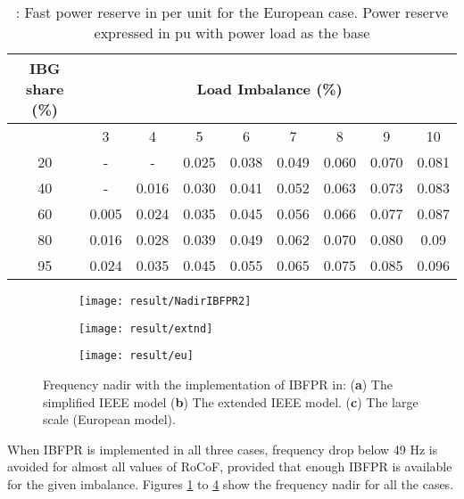 \begin{table}[h]
	\caption{\label{tb:crpowr}: Fast power reserve in per unit for the European case. Power reserve expressed in pu with power load as the base}
	\centering
	\begin{tabular}{*9c}
		\toprule
		\textbf{IBG share (\%)}	& \multicolumn{8}{c}{\textbf{Load Imbalance (\%)}} \\
		\midrule
		{} & 3&	4&	5&	6&	7&	8&	9	&10 \\
		\midrule
		20&	-&	-&	0.025&	0.038&	0.049&	0.060&	0.070&	0.081\\
		40&	-&	0.016&	0.030&	0.041&	0.052&	0.063&	0.073&	0.083\\
		60&	0.005&	0.024&	0.035&	0.045&	0.056&	0.066&	0.077&	0.087\\
		80&	0.016&	0.028&	0.039&	0.049&	0.062&	0.070&	0.080&	0.09\\

		95&	0.024&	0.035&	0.045&	0.055&	0.065&	0.075&	0.085&	0.096\\
		\bottomrule
	\end{tabular}
\end{table}
\begin{figure}[h]
	\centering
	\begin{subfigure}[h]{0.49\textwidth}
		\centering
		\texttt{[image: result/NadirIBFPR2]}
		\caption{}
		\label{fig:res_ieee_ibfpr}
	\end{subfigure}
	\hfill
	\begin{subfigure}[h]{0.49\textwidth}
		\centering
		\texttt{[image: result/extnd]}
		\caption{}
		\label{fig:res_extd_ibfpr}
	\end{subfigure}
	\hfill
	\begin{subfigure}[h]{0.48\textwidth}
		\centering
		\texttt{[image: result/eu]}
		\caption{}
		\label{fig:res_euro_ibfpr}
	\end{subfigure}
	
	
	\caption{Frequency nadir with the implementation of IBFPR in: (\textbf{a}) The simplified IEEE model  (\textbf{b}) The extended IEEE model. (\textbf{c}) The large scale (European model). }
\end{figure}
When IBFPR is implemented in all three cases, frequency drop below 49 Hz is avoided for almost all values of RoCoF, provided that enough IBFPR is available for the given imbalance. Figures \ref{fig:res_ieee_ibfpr} to \ref{fig:res_euro_ibfpr} show the frequency nadir for all the cases.\\


